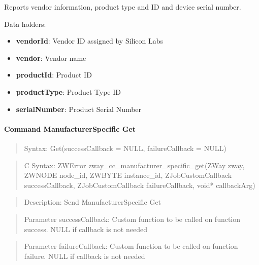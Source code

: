 Reports vendor information, product type and ID and device serial number.
\newline

\noindent
Data holders:

\begin{itemize}
\item \textbf{vendorId}: Vendor ID assigned by Silicon Labs
\item \textbf{vendor}: Vendor name
\item \textbf{productId}: Product ID
\item \textbf{productType}: Product Type ID
\item \textbf{serialNumber}: Product Serial Number
\end{itemize}

\paragraph{Command ManufacturerSpecific Get}
\begin{quote}Syntax: Get(successCallback = NULL, failureCallback = NULL)\end{quote}
\begin{quote}C Syntax: ZWError zway\_cc\_manufacturer\_specific\_get(ZWay zway, ZWNODE node\_id, ZWBYTE instance\_id, ZJobCustomCallback successCallback, ZJobCustomCallback failureCallback, void* callbackArg)\end{quote}
\begin{quote}Description: Send ManufacturerSpecific Get\end{quote}
\begin{quote}Parameter successCallback: Custom function to be called on function success. NULL if callback is not needed\end{quote}
\begin{quote}Parameter failureCallback: Custom function to be called on function failure. NULL if callback is not needed\end{quote}


